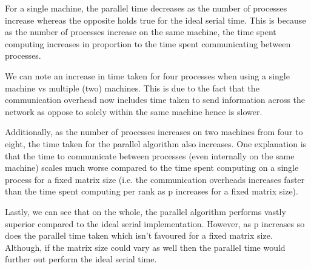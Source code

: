\documentclass[11pt, a4paper, parskip=full]{article}
\begin{document}
	For a single machine, the parallel time decreases as the number of processes increase whereas the opposite holds true for the ideal serial time. This is because as the number of processes increase on the same machine, the time spent computing increases in proportion to the time spent communicating between processes.
	
	We can note an increase in time taken for four processes when using a single machine vs multiple (two) machines. This is due to the fact that the communication overhead now includes time taken to send information across the network as oppose to solely within the same machine hence is slower.
	
	Additionally, as the number of processes increases on two machines from four to eight, the time taken for the parallel algorithm also increases. One explanation is that the time to communicate between processes (even internally on the same machine) scales much worse compared to the time spent computing on a single process for a fixed matrix size (i.e. the communication overheads increases faster than the time spent computing per rank as p increases for a fixed matrix size).
	
	Lastly, we can see that on the whole, the parallel algorithm performs vastly superior compared to the ideal serial implementation. However, as p increases so does the parallel time taken which isn't favoured for a fixed matrix size. Although, if the matrix size could vary as well then the parallel time would further out perform the ideal serial time.
	
	
		
\end{document}
